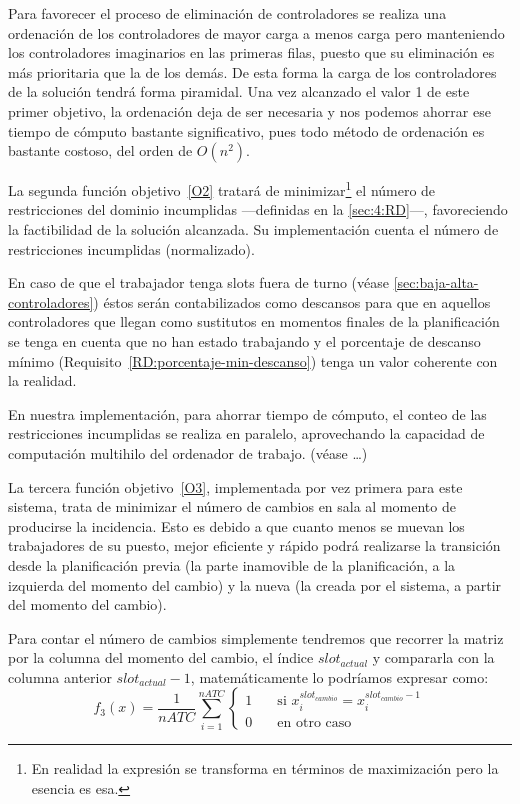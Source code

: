 Para favorecer el proceso de eliminación de controladores se realiza una ordenación de los controladores de mayor carga a menos carga pero manteniendo los controladores imaginarios en las primeras filas, puesto que su eliminación es más prioritaria que la de los demás. De esta forma la carga de los controladores de la solución tendrá forma piramidal. Una vez alcanzado el valor 1 de este primer objetivo, la ordenación deja de ser necesaria y nos podemos ahorrar ese tiempo de cómputo bastante significativo, pues todo método de ordenación es bastante costoso, del orden de $O(n^2)$. 

La segunda función objetivo~\ref{O2} tratará de minimizar\footnote{En realidad la expresión se transforma en términos de maximización pero la esencia es esa.} el número de restricciones del dominio incumplidas ---definidas en la \autoref{sec:4:RD}---, favoreciendo la factibilidad de la solución alcanzada. Su implementación cuenta el número de restricciones incumplidas (normalizado).

En caso de que el trabajador tenga slots fuera de turno (véase \autoref{sec:baja-alta-controladores}) éstos serán contabilizados como descansos para que en aquellos controladores que llegan como sustitutos en momentos finales de la planificación se tenga en cuenta que no han estado trabajando y el porcentaje de descanso mínimo (Requisito~\ref{RD:porcentaje-min-descanso}) tenga un valor coherente con la realidad.

En nuestra implementación, para ahorrar tiempo de cómputo, el conteo de las restricciones incumplidas se realiza en paralelo, aprovechando la capacidad de computación multihilo del ordenador de trabajo. (véase \ldots) %

La tercera función objetivo~\ref{O3}, implementada por vez primera para este sistema, trata de minimizar el número de cambios en sala al momento de producirse la incidencia. Esto es debido a que cuanto menos se muevan los trabajadores de su puesto, mejor eficiente y rápido podrá realizarse la transición desde la planificación previa (la parte inamovible de la planificación, a la izquierda del momento del cambio) y la nueva (la creada por el sistema, a partir del momento del cambio).

Para contar el número de cambios simplemente tendremos que recorrer la matriz por la columna del momento del cambio, el índice $slot_{actual}$ y compararla con la columna anterior $slot_{actual}-1$, matemáticamente lo podríamos expresar como:
%
\[
    f_3(x) = \frac{1}{nATC} \sum_{i=1}^{nATC}
    \begin{cases}
        1 & \quad \textrm{si } x_i^{slot_{cambio}} = x_i^{slot_{cambio}-1} \\
        0 & \quad \textrm{en otro caso }
    \end{cases}
\]


